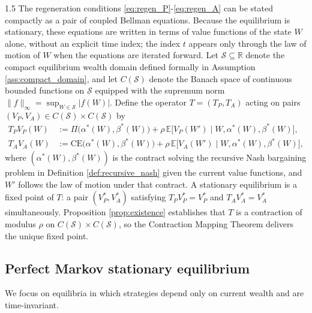 \documentclass[12pt]{article}
\theoremstyle{definition}
\theoremstyle{plain}
\begin{document}
\begin{spacing}{1.5}
The regeneration conditions \eqref{eq:regen_P}-\eqref{eq:regen_A} can be stated compactly as a pair of coupled Bellman equations. Because the equilibrium is stationary, these equations are written in terms of value functions of the state $W$ alone, without an explicit time index; the index $t$ appears only through the law of motion of $W$ when the equations are iterated forward. Let $\mathcal{S} \subseteq \mathbb{R}$ denote the compact equilibrium wealth domain defined formally in Assumption \ref{ass:compact_domain}, and let $C(\mathcal{S})$ denote the Banach space of continuous bounded functions on $\mathcal{S}$ equipped with the supremum norm $\|f\|_\infty = \sup_{W \in \mathcal{S}} |f(W)|$. Define the operator $T = (T_P, T_A)$ acting on pairs $(V_P, V_A) \in C(\mathcal{S}) \times C(\mathcal{S})$ by
\begin{align}
    T_P V_P(W) &:= \Pi\!\bigl(\alpha^*(W),\beta^*(W)\bigr)
    + \rho\,\mathbb{E}\bigl[V_P(W') \mid W, \alpha^*(W), \beta^*(W)\bigr],
    \label{eq:bellman_P}\\[4pt]
    T_A V_A(W) &:= \mathrm{CE}\!\bigl(\alpha^*(W),\beta^*(W)\bigr)
    + \rho\,\mathbb{E}\bigl[V_A(W') \mid W, \alpha^*(W), \beta^*(W)\bigr],
    \label{eq:bellman_A}
\end{align}
where $(\alpha^*(W),\beta^*(W))$ is the contract solving the recursive Nash bargaining problem in Definition \ref{def:recursive_nash} given the current value functions, and $W'$ follows the law of motion under that contract. A stationary equilibrium is a fixed point of $T$: a pair $(V_P^*, V_A^*)$ satisfying $T_P V_P^* = V_P^*$ and $T_A V_A^* = V_A^*$ simultaneously. Proposition \ref{prop:existence} establishes that $T$ is a contraction of modulus $\rho$ on $C(\mathcal{S}) \times C(\mathcal{S})$, so the Contraction Mapping Theorem delivers the unique fixed point.

\subsection{Perfect Markov stationary equilibrium}\label{subsec:pmse}

We focus on equilibria in which strategies depend only on current wealth and are time-invariant.


\end{spacing}
\end{document}
